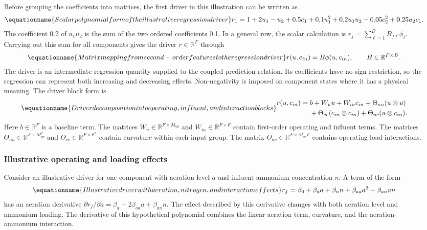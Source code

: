 Before grouping the coefficients into matrices, the first driver in this illustration can be written as
\begin{equation}
\equationname{Scalar polynomial form of the illustrative regression driver}
\label{eq:icsor_scalar_driver_example}
r_1=1+2u_1-u_2+0.5c_1+0.1u_1^2
+0.2u_1u_2-0.05c_2^2+0.25u_2c_1.
\end{equation}
The coefficient 0.2 of \(u_1u_2\) is the sum of the two ordered coefficients 0.1. In a general row, the scalar calculation is \(r_f=\sum_{\ell=1}^{D}B_{f\ell}\phi_\ell\). Carrying out this sum for all components gives the driver \(r\in\mathbb{R}^{F}\) through
\begin{equation}
\equationname{Matrix mapping from second-order features to the regression driver}
\label{eq:icsor_driver}
r(u,c_{in})=B\phi(u,c_{in}),
\qquad B\in\mathbb{R}^{F\times D}.
\end{equation}
The driver is an intermediate regression quantity supplied to the coupled prediction relation. Its coefficients have no sign restriction, so the regression can represent both increasing and decreasing effects. Non-negativity is imposed on component states where it has a physical meaning. The driver block form is
\begin{equation}
\equationname{Driver decomposition into operating, influent, and interaction blocks}
\label{eq:icsor_driver_blocks}
\begin{aligned}
r(u,c_{in})={}&b+W_u u+W_{in}c_{in}
+\Theta_{uu}(u\otimes u)\\
&+\Theta_{cc}(c_{in}\otimes c_{in})
+\Theta_{uc}(u\otimes c_{in}).
\end{aligned}
\end{equation}
Here \(b\in\mathbb{R}^{F}\) is a baseline term. The matrices \(W_u\in\mathbb{R}^{F\times M_{op}}\) and \(W_{in}\in\mathbb{R}^{F\times F}\) contain first-order operating and influent terms. The matrices \(\Theta_{uu}\in\mathbb{R}^{F\times M_{op}^{2}}\) and \(\Theta_{cc}\in\mathbb{R}^{F\times F^{2}}\) contain curvature within each input group. The matrix \(\Theta_{uc}\in\mathbb{R}^{F\times M_{op}F}\) contains operating-load interactions.

\subsubsection{Illustrative operating and loading effects}

Consider an illustrative driver for one component with aeration level \(a\) and influent ammonium concentration \(n\). A term of the form
\begin{equation}
\equationname{Illustrative driver with aeration, nitrogen, and interaction effects}
\label{eq:icsor_example_driver}
r_f=\beta_0+\beta_a a+\beta_n n+\beta_{aa}a^2+\beta_{an}an
\end{equation}
has an aeration derivative \(\partial r_f/\partial a=\beta_a+2\beta_{aa}a+\beta_{an}n\). The effect described by this derivative changes with both aeration level and ammonium loading. The derivative of this hypothetical polynomial combines the linear aeration term, curvature, and the aeration-ammonium interaction.

